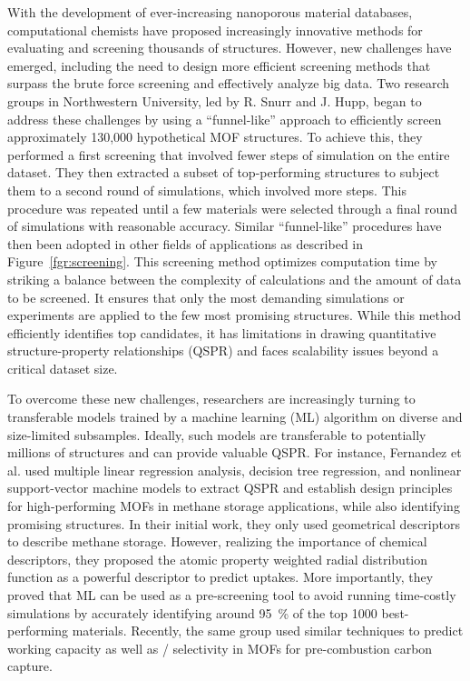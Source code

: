 \documentclass[main.tex]{subfiles}
\begin{document}
With the development of ever-increasing nanoporous material databases, computational chemists have proposed increasingly innovative methods for evaluating and screening thousands of structures. However, new challenges have emerged, including the need to design more efficient screening methods that surpass the brute force screening and effectively analyze big data. Two research groups in Northwestern University, led by R. Snurr and J. Hupp, began to address these challenges by using a ``funnel-like'' approach to efficiently screen approximately 130,000 hypothetical MOF structures.\autocite{Wilmer_2012} To achieve this, they performed a first screening that involved fewer steps of simulation on the entire dataset. They then extracted a subset of top-performing structures to subject them to a second round of simulations, which involved more steps. This procedure was repeated until a few materials were selected through a final round of simulations with reasonable accuracy. Similar ``funnel-like'' procedures have then been adopted in other fields of applications as described in Figure~\ref{fgr:screening}. This screening method optimizes computation time by striking a balance between the complexity of calculations and the amount of data to be screened. It ensures that only the most demanding simulations or experiments are applied to the few most promising structures. While this method efficiently identifies top candidates, it has limitations in drawing quantitative structure-property relationships (QSPR) and faces scalability issues beyond a critical dataset size.

To overcome these new challenges, researchers are increasingly turning to transferable models trained by a machine learning (ML) algorithm on diverse and size-limited subsamples. Ideally, such models are transferable to potentially millions of structures and can provide valuable QSPR. For instance, Fernandez et al.\autocite{Fernandez_2013} used multiple linear regression analysis, decision tree regression, and nonlinear support-vector machine models to extract QSPR and establish design principles for high-performing MOFs in methane storage applications, while also identifying promising structures. In their initial work, they only used geometrical descriptors to describe methane storage\autocite{Fernandez_2013}. However, realizing the importance of chemical descriptors, they proposed the atomic property weighted radial distribution function as a powerful descriptor to predict  uptakes.\autocite{Fernandez_2013_rdf} More importantly, they proved that ML can be used as a pre-screening tool to avoid running time-costly simulations by accurately identifying around \SI{95}{\percent} of the top 1000 best-performing materials. Recently, the same group used similar techniques to predict  working capacity as well as / selectivity in MOFs for pre-combustion carbon capture.\autocite{Dureckova_2019}
\end{document}
